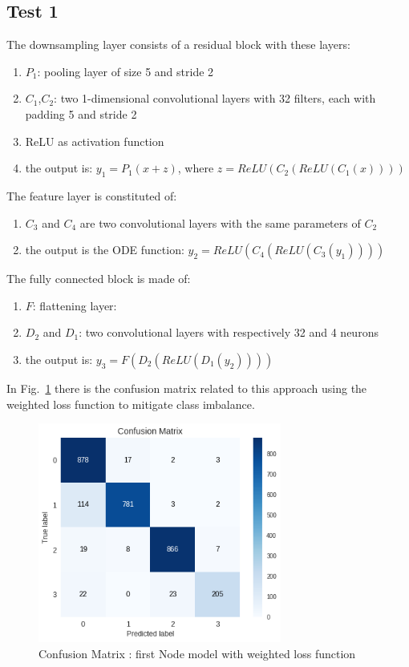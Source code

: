 \documentclass[LaM,binding=0.6cm]{sapthesis}
\begin{document}
\subsection{Test 1}
The downsampling layer consists of a residual block with these layers:
\begin{enumerate}
\item $P_1$: pooling layer of size 5 and stride 2
\item $C_1$,$C_2$: two 1-dimensional convolutional layers with 32 filters, each with padding 5 and stride 2
\item ReLU as activation function
\item the output is: $y_1=P_1\left(x+z\right)$, where $z=ReLU\left(C_2\left(ReLU\left(C_1\left(x\right)\right)\right)\right)$
\end{enumerate}
The feature layer is constituted of:
\begin{enumerate}
\item $C_3$ and $C_4$ are two convolutional layers with the same parameters of $C_2$
\item the output is the ODE function: $y_2=ReLU\left(C_4\left(ReLU\left(C_3\left(y_1\right)\right)\right)\right)$
\end{enumerate}
The fully connected block is made of:
\begin{enumerate}
\item $F$: flattening layer: 
\item $D_2$ and $D_1$:  two convolutional layers with respectively 32 and 4 neurons
\item the output is: $y_3=F(D_2(ReLU(D_1(y_2))))$
\end{enumerate}
In Fig.~\ref{fig:odetestwl} there is the confusion matrix related to this approach using the weighted loss function to mitigate class imbalance.
\begin{figure}   \centering
    \includegraphics[width=80mm,scale=0.7]{odetestwl.png}
    \caption{Confusion Matrix : first Node model with weighted loss function}
    \label{fig:odetestwl}
\end{figure}
\end{document}

